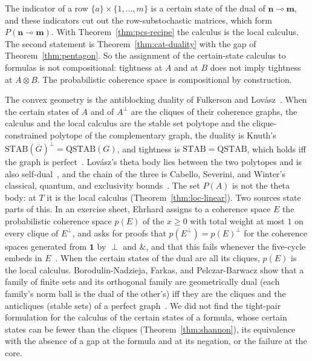 \noindent
The indicator of a row $\{a\} \times \{1, \dots, m\}$ is a certain state
of the dual of $\mathbf{n} \multimap \mathbf{m}$, and these indicators
cut out the row-substochastic matrices, which form
$P(\mathbf{n} \multimap \mathbf{m})$. With
Theorem~\ref{thm:pcs-recipe} the calculus is the local calculus. The
second statement is Theorem~\ref{thm:cat-duality} with the gap of
Theorem~\ref{thm:pentagon}. So the assignment of the certain-state
calculus to formulas is not compositional: tightness at $A$ and at $B$
does not imply tightness at $A \otimes B$. The probabilistic coherence space is compositional by
construction.

The convex geometry is the antiblocking duality of Fulkerson and
Lovász~\cite{fulkerson1971,lovasz1972}. When the certain states of $A$
and of $A^{\perp}$ are the cliques of their coherence graphs, the calculus and the local calculus are the
stable set polytope and the clique-constrained polytope of the
complementary graph, the duality is Knuth's
$\mathrm{STAB}(\overline{G})^{\perp} = \mathrm{QSTAB}(G)$, and
tightness is $\mathrm{STAB} = \mathrm{QSTAB}$, which holds iff the graph is
perfect~\cite{knuth1994,chvatal1975}. Lovász's theta body lies between
the two polytopes and is also self-dual~\cite{knuth1994}, and the chain
of the three is Cabello, Severini, and Winter's classical, quantum, and
exclusivity bounds~\cite{cabello2014}. The set $P(A)$ is not the theta
body: at $T$ it is the local calculus (Theorem~\ref{thm:loc-linear}).
Two sources state parts of this. In an exercise sheet, Ehrhard
assigns to a coherence space $E$ the probabilistic coherence space
$p(E)$ of the $x \ge 0$ with total weight at most $1$ on every clique of
$E^{\perp}$, and asks for proofs that $p(E^{\perp}) = p(E)^{\perp}$ for the
coherence spaces generated from $\mathbf{1}$ by $\perp$ and $\mathbin{\&}$,
and that this fails whenever the five-cycle embeds in
$E$~\cite{ehrhard-td2}. When the certain states of the dual are all its
cliques, $p(E)$ is the local calculus. Borodulin-Nadzieja, Farkas, and
Pelczar-Barwacz show that a family of finite sets and its orthogonal
family are geometrically dual (each family's norm ball is the dual of
the other's) iff they are the cliques and the anticliques (stable sets)
of a perfect graph~\cite{bfp2026}. We did not find the
tight-pair formulation for the calculus of the certain states of a
formula, whose certain states can be fewer than the cliques
(Theorem~\ref{thm:shannon}), its equivalence with the absence of a gap
at the formula and at its negation, or the failure at the core.

